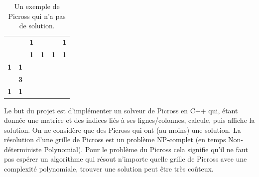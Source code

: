 \documentclass{article}
\begin{document}
\begin{table}[h]
\centering
\begin{tabular}{cccccc}
                   &                                 & \textbf{1}                                                           & \textbf{}                                     & \textbf{}                                     & \textbf{1}                                                           \\
                   & \textbf{}                       & \textbf{1}                                                           & \textbf{1}                                    & \textbf{1}                                    & \textbf{1}                                                           \\ \cline{3-6} 
\textbf{1}         & \multicolumn{1}{c|}{\textbf{1}} & \multicolumn{1}{c|}{\cellcolor[HTML]{000000}}                        & \multicolumn{1}{c|}{}                         & \multicolumn{1}{c|}{}                         & \multicolumn{1}{c|}{\cellcolor[HTML]{000000}}                        \\ \cline{3-6} 
\textit{\textbf{}} & \multicolumn{1}{c|}{\textbf{3}} & \multicolumn{1}{c|}{\cellcolor[HTML]{C0C0C0}{\color[HTML]{9B9B9B} }} & \multicolumn{1}{c|}{\cellcolor[HTML]{000000}} & \multicolumn{1}{c|}{\cellcolor[HTML]{000000}} & \multicolumn{1}{c|}{\cellcolor[HTML]{C0C0C0}{\color[HTML]{9B9B9B} }} \\ \cline{3-6} 
\textbf{1}         & \multicolumn{1}{c|}{\textbf{1}} & \multicolumn{1}{c|}{\cellcolor[HTML]{000000}}                        & \multicolumn{1}{c|}{}                         & \multicolumn{1}{c|}{}                         & \multicolumn{1}{c|}{\cellcolor[HTML]{000000}}                        \\ \cline{3-6} 
\end{tabular}
\caption{Un exemple de Picross qui n'a pas de solution.}
\end{table}
\newpage

Le but du projet est d'implémenter un solveur de Picross en C++ qui, étant donnée une matrice et des indices liés à ses lignes/colonnes, calcule, puis affiche la solution. On ne considère que des Picross qui ont (au moins) une solution.\newline
La résolution d'une grille de Picross est un problème NP-complet (en temps Non-déterministe Polynomial). Pour le problème du Picross cela signifie qu'il ne faut pas espérer un algorithme qui résout n'importe quelle grille de Picross avec une complexité polynomiale, trouver une solution peut être très coûteux.
\end{document}
